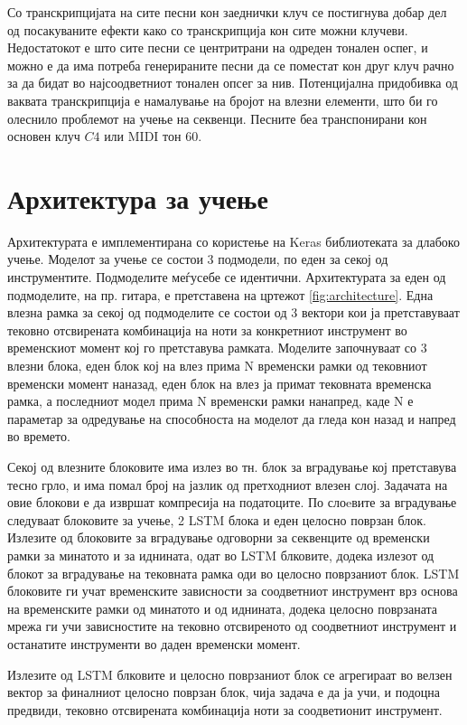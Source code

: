 Со транскрипцијата на сите песни кон заеднички клуч се постигнува добар дел од посакуваните ефекти како со транскрипција кон сите можни клучеви. Недостатокот е што сите песни се центритрани на одреден тонален оспег, и можно е да има потреба генерираните песни да се поместат кон друг клуч рачно за да бидат во најсоодветниот тонален опсег за нив. Потенцијална придобивка од ваквата транскрипција е намалување на бројот на влезни елементи, што би го олеснило проблемот на учење на секвенци. Песните беа транспонирани кон основен клуч $C4$ или MIDI тон 60.

\section{Архитектура за учење}

Архитектурата е имплементирана со користење на Keras библиотеката за длабоко учење. Моделот за учење се состои 3 подмодели, по еден за секој од инструментите. Подмоделите меѓусебе се идентични. Архитектурата за еден од подмоделите, на пр. гитара, е претставена на цртежот \ref{fig:architecture}. Една влезна рамка за секој од подмоделите се состои од 3 вектори кои ја претставуваат тековно отсвирената комбинација на ноти за конкретниот инструмент во временскиот момент кој го претставува рамката. Моделите започнуваат со 3 влезни блока, еден блок кој на влез прима N временски рамки од тековниот временски момент наназад, еден блок на влез ја примат тековната временска рамка, а последниот модел прима N временски рамки нанапред, каде N е параметар за одредување на способноста на моделот да гледа кон назад и напред во времето.

Секој од влезните блоковите има излез во тн. блок за вградување кој претставува тесно грло, и има помал број на јазлик од претходниот влезен слој. Задачата на овие блокови е да извршат компресија на податоците. По слоeвите за вградување следуваат блоковите за учење, 2 LSTM блока и еден целосно поврзан блок. Излезите од блоковите за вградување одговорни за секвенците од временски рамки за минатото и за иднината, одат во LSTM блковите, додека излезот од блокот за вградување на тековната рамка оди во целосно поврзаниот блок. LSTM блоковите ги учат временските зависности за соодветниот инструмент врз основа на временските рамки од минатото и од иднината, додека целосно поврзаната мрежа ги учи зависностите на тековно отсвиреното од соодветниот инструмент и останатите инструменти во даден временски момент. 

Излезите од LSTM блковите и целосно поврзаниот блок се агрегираат во велзен вектор за финалниот целосно поврзан блок, чија задача е да ја учи, и подоцна предвиди, тековно отсвирената комбинација ноти за соодветионит инструмент.

